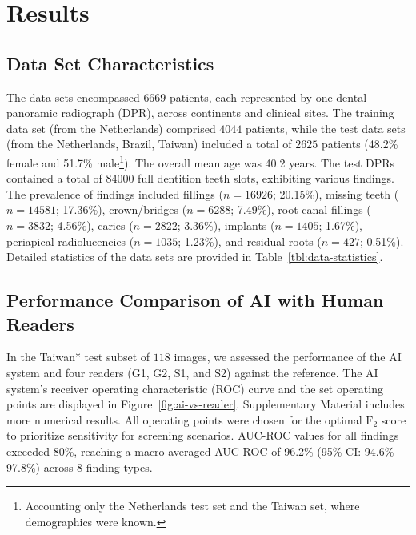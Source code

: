 \section{Results}

\subsection{Data Set Characteristics}
The data sets encompassed $\num{6669}$ patients, each represented by one dental panoramic radiograph (DPR), across continents and clinical sites. 
The training data set (from the Netherlands) comprised $\num{4044}$ patients, while the test data sets (from the Netherlands, Brazil, Taiwan) included a total of $\num{2625}$ patients (48.2\% female and 51.7\% male\footnote{Accounting only the Netherlands test set and the Taiwan set, where demographics were known.}).
The overall mean age was 40.2 years.
The test DPRs contained a total of \num{84000} full dentition teeth slots, exhibiting various findings.
The prevalence of findings included fillings ($n=\num{16926}$; 20.15\%), missing teeth ($n=\num{14581}$; 17.36\%), crown/bridges ($n=\num{6288}$; 7.49\%), root canal fillings ($n=\num{3832}$; 4.56\%), caries ($n=\num{2822}$; 3.36\%), implants ($n=\num{1405}$; 1.67\%), periapical radiolucencies ($n=\num{1035}$; 1.23\%), and residual roots ($n=\num{427}$; 0.51\%).
Detailed statistics of the data sets are provided in Table~\ref{tbl:data-statistics}.

\subsection{Performance Comparison of AI with Human Readers}
\label{sec:ai-vs-reader}



In the Taiwan* test subset of $\num{118}$ images, we assessed the performance of the AI system and four readers (G1, G2, S1, and S2) against the reference.
The AI system's receiver operating characteristic (ROC) curve and the set operating points are displayed in Figure~\ref{fig:ai-vs-reader}.
Supplementary Material includes more numerical results.
All operating points were chosen for the optimal $\textrm{F}_2$ score to prioritize sensitivity for screening scenarios.
AUC-ROC values for all findings exceeded 80\%, reaching a macro-averaged AUC-ROC of 96.2\% (95\% CI: 94.6\%--97.8\%) across 8 finding types.

